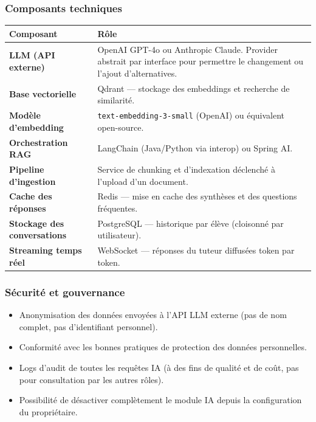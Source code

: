 \documentclass[12pt,a4paper]{article}
\begin{document}
\subsubsection{Composants techniques}

\renewcommand{\arraystretch}{1.3}
\begin{longtable}{>{\bfseries\color{primary}}p{4cm} p{10cm}}
    \toprule
    \textbf{\color{primary}Composant} & \textbf{\color{primary}Rôle} \\
    \midrule
    \endhead

    LLM (API externe) & OpenAI GPT-4o ou Anthropic Claude. Provider abstrait par interface pour permettre le changement ou l'ajout d'alternatives. \\
    \rowcolor{lightgray}
    Base vectorielle & Qdrant --- stockage des embeddings et recherche de similarité. \\
    Modèle d'embedding & \texttt{text-embedding-3-small} (OpenAI) ou équivalent open-source. \\
    \rowcolor{lightgray}
    Orchestration RAG & LangChain (Java/Python via interop) ou Spring AI. \\
    Pipeline d'ingestion & Service de chunking et d'indexation déclenché à l'upload d'un document. \\
    \rowcolor{lightgray}
    Cache des réponses & Redis --- mise en cache des synthèses et des questions fréquentes. \\
    Stockage des conversations & PostgreSQL --- historique par élève (cloisonné par utilisateur). \\
    \rowcolor{lightgray}
    Streaming temps réel & WebSocket --- réponses du tuteur diffusées token par token. \\
    \bottomrule
\end{longtable}


\subsubsection{Sécurité et gouvernance}

\begin{itemize}[leftmargin=*,itemsep=4pt]
    \item Anonymisation des données envoyées à l'API LLM externe (pas de nom complet, pas d'identifiant personnel).
    \item Conformité avec les bonnes pratiques de protection des données personnelles.
    \item Logs d'audit de toutes les requêtes IA (à des fins de qualité et de coût, pas pour consultation par les autres rôles).
    \item Possibilité de désactiver complètement le module IA depuis la configuration du propriétaire.
\end{itemize}
\end{document}

